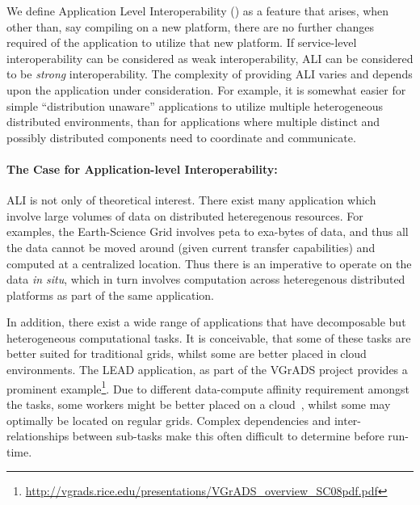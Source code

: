\documentclass[3p,twocolumn]{elsarticle}
\begin{document}
We define Application Level Interoperability () as a feature
that arises, when other than, say compiling on a new platform, there are
no further changes required of the application to utilize that new
platform.  If service-level interoperability can be considered as weak
interoperability, ALI can be considered to be {\it strong}
interoperability.  %
The complexity of providing ALI varies and depends upon the
application under consideration.  For example, it is somewhat easier
for simple ``distribution unaware'' applications to utilize multiple
heterogeneous distributed environments, than for applications where
multiple distinct and possibly distributed components need to
coordinate and communicate.  %

\paragraph{The Case for Application-level Interoperability:}

ALI is not only of theoretical interest. There exist many application
which involve large volumes of data on distributed heteregenous
resources. For examples, the Earth-Science Grid involves peta to
exa-bytes of data, and thus all the data cannot be moved around (given
current transfer capabilities) and computed at a centralized location.
Thus there is an imperative to operate on the data {\it in situ},
which in turn involves computation across heteregenous distributed
platforms as part of the same application.
 
In addition, there exist a wide range of applications that have
decomposable but heterogeneous computational tasks. It is conceivable,
that some of these tasks are better suited for traditional grids,
whilst some are better placed in cloud environments.  The LEAD
application, as part of the VGrADS project provides a prominent
example\footnote{\url{http://vgrads.rice.edu/presentations/VGrADS_overview_SC08pdf.pdf}}.
Due to different data-compute affinity requirement amongst the tasks,
some workers might be better placed on a cloud~\cite{jha_ccpe09},
whilst some may optimally be located on regular grids. Complex
dependencies and inter-relationships between sub-tasks make this often
difficult to determine before run-time.  %
\end{document}

